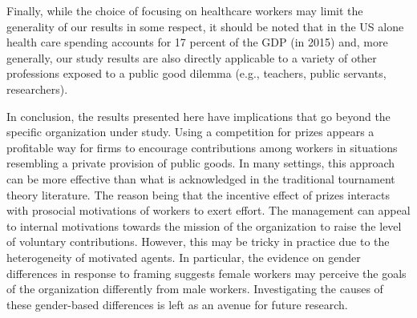\documentclass[11pt, titlepage]{article}
\begin{document}
Finally, while the choice of focusing on healthcare workers may limit
the generality of our results in some respect, it should be noted that
in the US alone health care spending accounts for 17 percent of the GDP
(in 2015) and, more generally, our study results are also directly
applicable to a variety of other professions exposed to a public good
dilemma (e.g., teachers, public servants, researchers).

In conclusion, the results presented here have implications that go
beyond the specific organization under study. Using a competition for
prizes appears a profitable way for firms to encourage contributions
among workers in situations resembling a private provision of public
goods. In many settings, this approach can be more effective than what
is acknowledged in the traditional tournament theory literature. The
reason being that the incentive effect of prizes interacts with
prosocial motivations of workers to exert effort. The management can
appeal to internal motivations towards the mission of the organization
to raise the level of voluntary contributions. However, this may be
tricky in practice due to the heterogeneity of motivated agents. In
particular, the evidence on gender differences in response to framing
suggests female workers may perceive the goals of the organization
differently from male workers. Investigating the causes of these
gender-based differences is left as an avenue for future research.

\renewcommand\refname{References}

\end{document}
